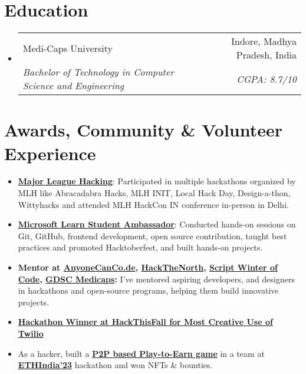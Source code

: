 \documentclass[letterpaper,11pt]{article}
\makeatletter
\newcommand{\resumeItem}[1]{
  \item\small{
    {#1 \vspace{-2pt}}
  }
}
\newcommand{\resumeSubheading}[4]{
  \item
    \begin{tabular*}{0.97\textwidth}[t]{l@{\extracolsep{\fill}}r}
      {#1} & #2 \\
      \textit{\small#3} & \textit{\small #4} \\
    \end{tabular*}\vspace{-5pt}
}
\newcommand{\resumeSubHeadingListStart}{\begin{itemize}[leftmargin=0.15in, label={}]}
\newcommand{\resumeSubHeadingListEnd}{\end{itemize}}
\newcommand{\resumeItemListStart}{\begin{itemize}}
\newcommand{\resumeItemListEnd}{\end{itemize}}
\makeatother
\begin{document}
\section{Education}
\resumeSubHeadingListStart
\resumeSubheading
{Medi-Caps University}{Indore, Madhya Pradesh, India}
{Bachelor of Technology in Computer Science and Engineering}{CGPA: 8.7/10}
\resumeSubHeadingListEnd



\section{Awards, Community \& Volunteer Experience}
\begin{itemize}[leftmargin=0.15in, label={}]
  \small{\item{
      \resumeItemListStart
              \resumeItem{\textbf{\href{https://mlh.io}{Major League Hacking}}{: Participated in multiple hackathons organized by MLH like Abracadabra Hacks, MLH INIT, Local Hack Day, Design-a-thon, Wittyhacks and attended MLH HackCon IN conference in-person in Delhi.}} \vspace{3pt}
              \resumeItem{\textbf{\href{https://studentambassadors.microsoft.com/}{Microsoft Learn Student Ambassador}}{: Conducted hands-on sessions on Git, GitHub, frontend development, open source contribution, taught best practices and promoted Hacktoberfest, and built hands-on projects.}} \vspace{3pt}
              \resumeItem{\textbf{Mentor at {\href{https://hackacode.anyonecanco.de}{AnyoneCanCo.de}}, {\href{https://hackthenorth.com}{HackTheNorth}}, {\href{https://swoc.scriptindia.org}{Script Winter of Code}}, {\href{https://gdsc.community.dev/medi-caps-university-indore}{GDSC Medicaps}}:}
{I've mentored aspiring developers, and designers in hackathons and open-source programs, helping them build innovative projects.}} \vspace{3pt}
              \resumeItem{\textbf{\href{https://devpost.com/software/budgetstay}{Hackathon Winner at HackThisFall for Most Creative Use of Twilio}}} \vspace{3pt}
              \resumeItem{{As a hacker, built a {\textbf{\href{https://devfolio.co/projects/mystic-899b}{{P2P based Play-to-Earn game}}}} in a team at {\textbf{\href{https://ethindia.co/}{{ETHIndia'23}}}} hackathon and won NFTs \& bounties. }} \vspace{3pt} 
    \resumeItemListEnd
  }}
\end{itemize}
\end{document}
